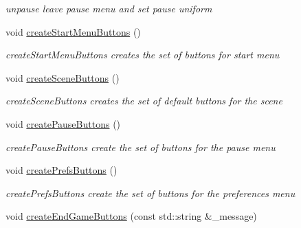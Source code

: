 \begin{DoxyCompactItemize}
\begin{DoxyCompactList}\small\item\em unpause leave pause menu and set pause uniform \end{DoxyCompactList}\item 
\hypertarget{class_gui_ab9f1b8bd0ca81a7c2ea19d5aabe34ef8}{}void \hyperlink{class_gui_ab9f1b8bd0ca81a7c2ea19d5aabe34ef8}{create\+Start\+Menu\+Buttons} ()\label{class_gui_ab9f1b8bd0ca81a7c2ea19d5aabe34ef8}

\begin{DoxyCompactList}\small\item\em create\+Start\+Menu\+Buttons creates the set of buttons for start menu \end{DoxyCompactList}\item 
\hypertarget{class_gui_aa1c676af422be41e51ee6ef8822f5375}{}void \hyperlink{class_gui_aa1c676af422be41e51ee6ef8822f5375}{create\+Scene\+Buttons} ()\label{class_gui_aa1c676af422be41e51ee6ef8822f5375}

\begin{DoxyCompactList}\small\item\em create\+Scene\+Buttons creates the set of default buttons for the scene \end{DoxyCompactList}\item 
\hypertarget{class_gui_a7eccf8c2cb3f618697901f19b07f8423}{}void \hyperlink{class_gui_a7eccf8c2cb3f618697901f19b07f8423}{create\+Pause\+Buttons} ()\label{class_gui_a7eccf8c2cb3f618697901f19b07f8423}

\begin{DoxyCompactList}\small\item\em create\+Pause\+Buttons create the set of buttons for the pause menu \end{DoxyCompactList}\item 
\hypertarget{class_gui_a0d617614927b7505423a01bb305f925e}{}void \hyperlink{class_gui_a0d617614927b7505423a01bb305f925e}{create\+Prefs\+Buttons} ()\label{class_gui_a0d617614927b7505423a01bb305f925e}

\begin{DoxyCompactList}\small\item\em create\+Prefs\+Buttons create the set of buttons for the preferences menu \end{DoxyCompactList}\item 
\hypertarget{class_gui_a2a4e35862034a6f6cb1fc72ae1e092c3}{}void \hyperlink{class_gui_a2a4e35862034a6f6cb1fc72ae1e092c3}{create\+End\+Game\+Buttons} (const std\+::string \&\+\_\+message)\label{class_gui_a2a4e35862034a6f6cb1fc72ae1e092c3}


\end{DoxyCompactItemize}
